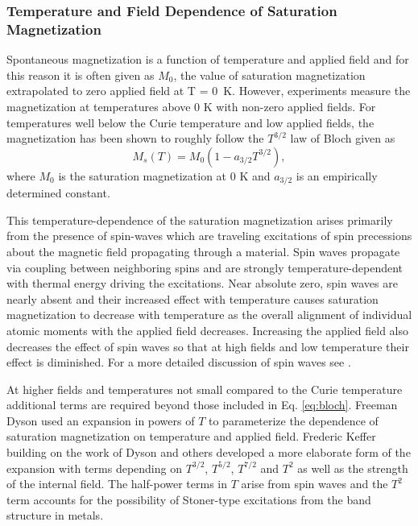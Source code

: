 \documentclass[preprint,12pt]{elsarticle}
\begin{document}
\subsubsection{Temperature and Field Dependence of Saturation Magnetization \label{sec:sat_mag_THdep}}
Spontaneous magnetization is a function of temperature and applied field and for this reason it is often given as $M_{0}$, the value of saturation magnetization extrapolated to zero applied field at T = 0~K. However, experiments measure the magnetization at temperatures above 0 K with non-zero applied fields. For temperatures well below the Curie temperature and low applied fields, the magnetization has been shown to roughly follow the $T^{3/2}$ law of Bloch given as \cite{Bloch1930}
\begin{equation}
M_s(T) = M_0(1-a_{3/2}T^{3/2}),
\label{eq:bloch}
\end{equation}
where $M_0$ is the saturation magnetization at 0 K and $a_{3/2}$ is an empirically determined constant.  

This temperature-dependence of the saturation magnetization arises primarily from the presence of spin-waves which are traveling excitations of spin precessions about the magnetic field propagating through a material. Spin waves propagate via coupling between neighboring spins and are strongly temperature-dependent with thermal energy driving the excitations. Near absolute zero, spin waves are nearly absent and their increased effect with temperature causes saturation magnetization to decrease with temperature as the overall alignment of individual atomic moments with the applied field decreases. Increasing the applied field also decreases the effect of spin waves so that at  high fields and low temperature their effect is diminished. For a more detailed discussion of spin waves see \cite{Kittel1951,Dyson1956_2,Foner1969,PauthenetMar1982}.

At higher fields and temperatures not small compared to the Curie temperature additional terms are required beyond those included in Eq. \ref{eq:bloch}. Freeman Dyson used an expansion in powers of $T$ to parameterize the dependence of saturation magnetization on temperature and applied field\cite{Dyson1956,Dyson1956_2}. Frederic Keffer building on the work of Dyson and others developed a more elaborate form of the expansion with terms depending on $T^{3/2}$, $T^{5/2}$, $T^{7/2}$ and $T^2$ as well as the strength of the internal field\cite{Keffer1966}. The half-power terms in $T$ arise from spin waves and the $T^2$ term accounts for the possibility of Stoner-type excitations from the band structure in metals\cite{PauthenetNov1982}.
\end{document}
